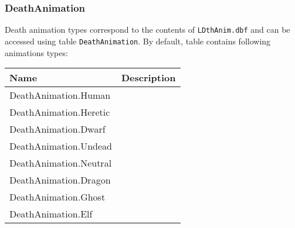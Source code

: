 \subsubsection{DeathAnimation}
\label{DeathAnimationCategory}
Death animation types correspond to the contents of \texttt{LDthAnim.dbf} and can be accessed using table \texttt{DeathAnimation}.
By default, table contains following animations types:\\
\begin{tabularx}{\linewidth}{| l | X |}
\hline
\textbf{Name} & \textbf{Description} \\
\hline
DeathAnimation.Human &\\
\hline
DeathAnimation.Heretic &\\
\hline
DeathAnimation.Dwarf &\\
\hline
DeathAnimation.Undead &\\
\hline
DeathAnimation.Neutral &\\
\hline
DeathAnimation.Dragon &\\
\hline
DeathAnimation.Ghost &\\
\hline
DeathAnimation.Elf &\\
\hline
\end{tabularx}

